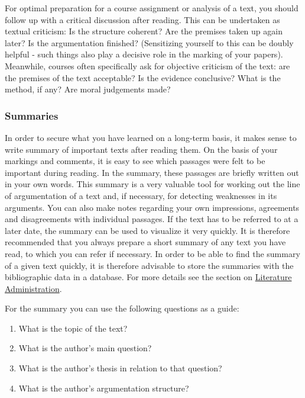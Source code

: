 \documentclass[
  english,
]{scrreprt}
\begin{document}
For optimal preparation for a course assignment or analysis of a text, you should follow up with a critical discussion after reading. This can be undertaken as textual criticism: Is the structure coherent? Are the premises taken up again later? Is the argumentation finished? (Sensitizing yourself to this can be doubly helpful - such things also play a decisive role in the marking of your papers). Meanwhile, courses often specifically ask for objective criticism of the text: are the premises of the text acceptable? Is the evidence conclusive? What is the method, if any? Are moral judgements made?

\subsubsection{Summaries}\label{sec:summaries}

In order to secure what you have learned on a long-term basis, it makes sense to write summary of important texts after reading them. On the basis of your markings and comments, it is easy to see which passages were felt to be important during reading. In the summary, these passages are briefly written out in your own words. This summary is a very valuable tool for working out the line of argumentation of a text and, if necessary, for detecting weaknesses in its arguments. You can also make notes regarding your own impressions, agreements and disagreements with individual passages. If the text has to be referred to at a later date, the summary can be used to visualize it very quickly. It is therefore recommended that you always prepare a short summary of any text you have read, to which you can refer if necessary. In order to be able to find the summary of a given text quickly, it is therefore advisable to store the summaries with the bibliographic data in a database. For more details see the section on \hyperref[sec:literature_administration]{Literature Administration}.

For the summary you can use the following questions as a guide:

\begin{enumerate}
\def\labelenumi{\arabic{enumi}.}
\item
  What is the topic of the text?
\item
  What is the author’s main question?
\item
  What is the author’s thesis in relation to that question?
\item
  What is the author’s argumentation structure?
\end{enumerate}
\end{document}
